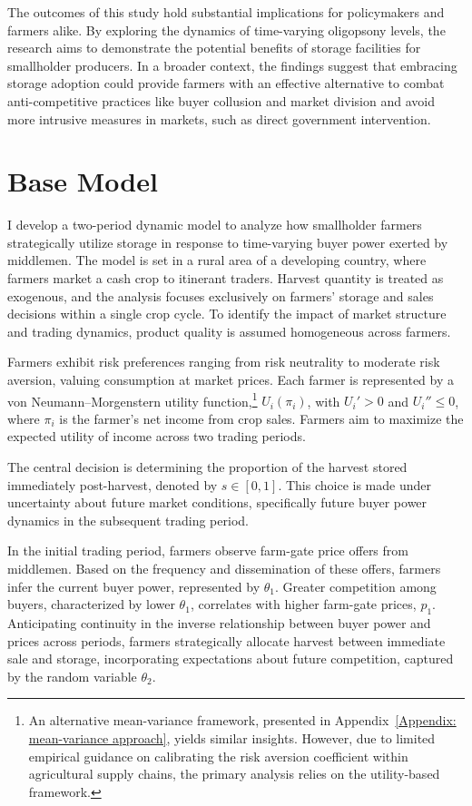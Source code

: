 The outcomes of this study hold substantial implications for policymakers and farmers alike. By exploring the dynamics of time-varying oligopsony levels, the research aims to demonstrate the potential benefits of storage facilities for smallholder producers. In a broader context, the findings suggest that embracing storage adoption could provide farmers with an effective alternative to combat anti-competitive practices like buyer collusion and market division and avoid more intrusive measures in markets, such as direct government intervention.





\section{Base Model}

I develop a two-period dynamic model to analyze how smallholder farmers strategically utilize storage in response to time-varying buyer power exerted by middlemen. The model is set in a rural area of a developing country, where farmers market a cash crop to itinerant traders. Harvest quantity is treated as exogenous, and the analysis focuses exclusively on farmers' storage and sales decisions within a single crop cycle. To identify the impact of market structure and trading dynamics, product quality is assumed homogeneous across farmers.

Farmers exhibit risk preferences ranging from risk neutrality to moderate risk aversion, valuing consumption at market prices. Each farmer is represented by a von Neumann–Morgenstern utility function,\footnote{An alternative mean-variance framework, presented in Appendix~\ref{Appendix: mean-variance approach}, yields similar insights. However, due to limited empirical guidance on calibrating the risk aversion coefficient within agricultural supply chains, the primary analysis relies on the utility-based framework.} $U_i(\pi_i)$, with $U_i' > 0$ and $U_i'' \leq 0$, where $\pi_i$ is the farmer's net income from crop sales. Farmers aim to maximize the expected utility of income across two trading periods.

The central decision is determining the proportion of the harvest stored immediately post-harvest, denoted by $s \in [0,1]$. This choice is made under uncertainty about future market conditions, specifically future buyer power dynamics in the subsequent trading period.

In the initial trading period, farmers observe farm-gate price offers from middlemen. Based on the frequency and dissemination of these offers, farmers infer the current buyer power, represented by $\theta_1$. Greater competition among buyers, characterized by lower $\theta_1$, correlates with higher farm-gate prices, $p_1$. Anticipating continuity in the inverse relationship between buyer power and prices across periods, farmers strategically allocate harvest between immediate sale and storage, incorporating expectations about future competition, captured by the random variable $\theta_2$.


